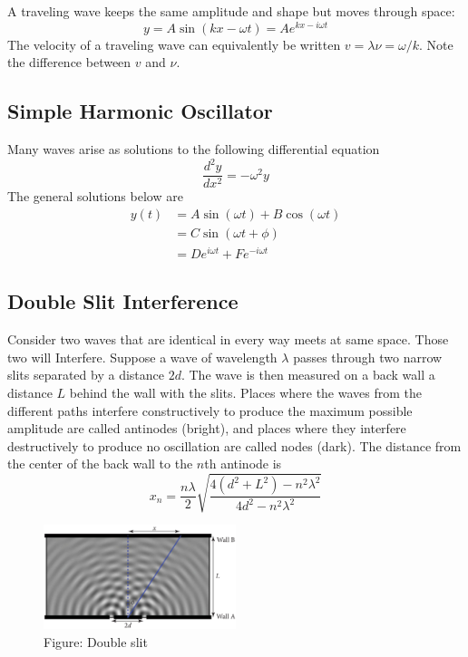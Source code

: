 \documentclass[../main.tex]{subfiles}
\begin{document}
A traveling wave keeps the same amplitude and shape but moves through space:
\begin{equation*}
    y=A\sin (kx-\omega t)=Ae^{kx-i\omega t}
\end{equation*}
The velocity of a traveling wave can equivalently be written $v =\lambda \nu=\omega /k$. Note the difference between $v$ and $\nu$.

\subsection*{Simple Harmonic Oscillator}
Many waves arise as solutions to the following differential equation
\begin{equation*}
    \frac{d^2y}{dx^2}=-\omega^2y
\end{equation*}
The  general solutions below are 
\begin{align*}
    y(t)&=A \sin(\omega t) + B \cos(\omega t)\\
    &=C \sin(\omega t + \phi)\\
    &=De^{i\omega t} + Fe^{- i\omega t}
\end{align*}

\subsection*{Double Slit Interference }
Consider two waves that are identical in every way meets at same space. Those two will Interfere. Suppose a wave of wavelength $\lambda$ passes through two narrow slits separated by a distance $2d$. The wave is then measured on a back wall a distance $L$ behind the wall with the slits. Places where the waves from the different paths interfere constructively to produce the maximum possible amplitude are called antinodes (bright), and places where they interfere destructively to produce no oscillation are called nodes (dark). The distance from the center of the back wall to the $n$th antinode is
\begin{equation*}
    x_n=\frac{n\lambda}{2}\sqrt{\frac{4 (d^2 + L^2) - n^2\lambda^2}{4d^2 - n^2\lambda^2}}
\end{equation*}
 \begin{figure}
    \centering
    \includegraphics[width=0.5\textwidth]{../Rss/Waves/2Slits.png}
    \caption*{Figure: Double slit}
\end{figure}
\end{document}

